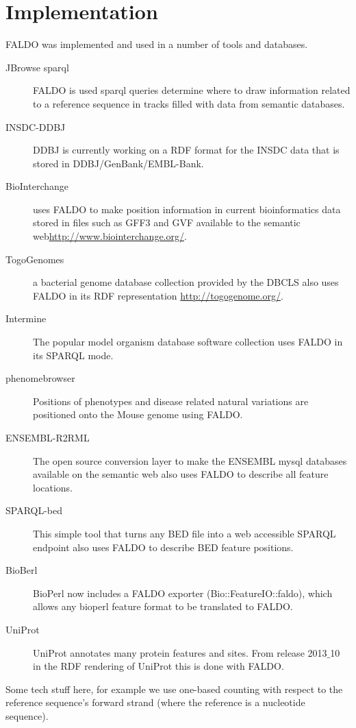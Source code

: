 \section*{Implementation}
FALDO was implemented and used in a number of tools and databases.

\begin{description}
\item[JBrowse sparql] FALDO is used sparql queries determine where to draw information related to a reference sequence in tracks filled with data from semantic databases. 
\item[INSDC-DDBJ] DDBJ is currently working on a RDF format for the INSDC data that is stored in DDBJ/GenBank/EMBL-Bank.
\item[BioInterchange] uses FALDO to make position information in current bioinformatics data stored in files such as GFF3 and GVF available to the semantic web\url{http://www.biointerchange.org/}.
\item[TogoGenomes] a bacterial genome database collection provided by the DBCLS also uses FALDO in its RDF representation \url{http://togogenome.org/}.
\item[Intermine] The popular model organism database software collection uses FALDO in its SPARQL mode.
\item[phenomebrowser] Positions of phenotypes and disease related natural variations are positioned onto the Mouse genome using FALDO.
\item[ENSEMBL-R2RML] The open source conversion layer to make the ENSEMBL mysql databases available on the semantic web also uses FALDO to describe all feature locations.
\item[SPARQL-bed] This simple tool that turns any BED file into a web accessible SPARQL endpoint also uses FALDO to describe BED feature positions.
\item[BioBerl] BioPerl\cite{BioPerl2002} now includes a FALDO exporter (Bio::FeatureIO::faldo), which allows any bioperl feature format to be translated to FALDO.
\item[UniProt] UniProt annotates many protein features and sites. From release 2013$\_$10 in the RDF rendering of UniProt this is done with FALDO.
\end{description}




Some tech stuff here, for example we use one-based counting
with respect to the reference sequence's forward strand
(where the reference is a nucleotide sequence).

